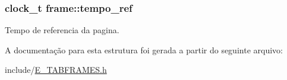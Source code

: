 \hypertarget{structframe_a0127826e370fe79cf83eb73d3c91672a}{}
\subsubsection[{tempo\+\_\+ref}]{\setlength{\rightskip}{0pt plus 5cm}clock\+\_\+t frame\+::tempo\+\_\+ref}\label{structframe_a0127826e370fe79cf83eb73d3c91672a}


Tempo de referencia da pagina. 



A documentação para esta estrutura foi gerada a partir do seguinte arquivo\+:\begin{DoxyCompactItemize}
\item 
include/\hyperlink{_e___t_a_b_f_r_a_m_e_s_8h}{E\+\_\+\+T\+A\+B\+F\+R\+A\+M\+E\+S.\+h}\end{DoxyCompactItemize}
